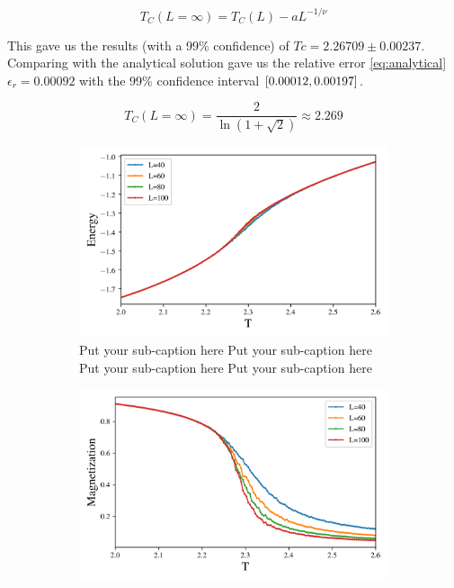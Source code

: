  \begin{equation}
   \label{eq:scaling}
   T_C(L=\infty) = T_C(L) - aL^{-1/\nu}
 \end{equation}

 This gave us the results (with a 99\% confidence) of $Tc=2.26709 \pm 0.00237$.
 Comparing with the analytical solution gave us the relative error
 \cref{eq:analytical} $\epsilon_r = 0.00092$ with the 99\% confidence interval
 $\left[0.00012,0.00197\right]$.

\begin{equation}
  \label{eq:analytical}
  T_C(L=\infty) = \frac{2}{\ln(1 + \sqrt2)} \approx 2.269
\end{equation}


\begin{figure}[ht]
  \begin{subfigure}[t]{.5\textwidth} %
    \centering
    \includegraphics[width=\linewidth]{../figures/phase_E.png}
    \caption{Put your sub-caption here
    Put your sub-caption here
    Put your sub-caption here
    Put your sub-caption here}
    \label{fig:sub-first}
  \end{subfigure}
  \hfill
  \begin{subfigure}[t]{.5\textwidth}
    \centering
    \includegraphics[width=\linewidth]{../figures/phase_Mabs.png}

\end{subfigure}
\end{figure}
